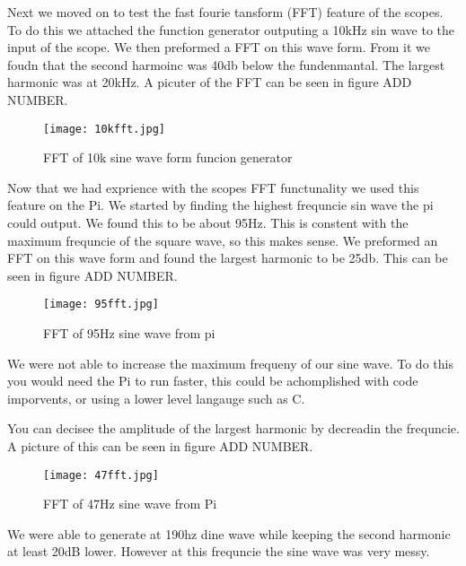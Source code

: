 \documentclass[prl,12pt,notitlepage,aps,onecolumn,superscriptaddress]{revtex4-1}
\begin{document}
Next we moved on to test the fast fourie tansform (FFT) feature of the scopes. To do this we attached the function generator outputing a 10kHz sin wave to the input of the scope. We then preformed a FFT on this wave form. From it we foudn that the second harmoinc was 40db below the fundenmantal. The largest harmonic was at 20kHz. A picuter of the FFT can be seen in figure ADD NUMBER.

\begin{figure}[h]
\begin{center}
\texttt{[image: 10kfft.jpg]}
\end{center}
\caption{\label{fig:pic} FFT of 10k sine wave form funcion generator}
\end{figure}

Now that we had exprience with the scopes FFT functunality we used this feature on the Pi. We started by finding the highest frequncie sin wave the pi could output. We found this to be about 95Hz. This is constent with the maximum frequncie of the square wave, so this makes sense. We preformed an FFT on this wave form and found the largest harmonic to be 25db. This can be seen in figure ADD NUMBER.

\begin{figure}[h]
\begin{center}
\texttt{[image: 95fft.jpg]}
\end{center}
\caption{\label{fig:pic} FFT of 95Hz sine wave from pi}
\end{figure}

We were not able to increase the maximum frequeny of our sine wave. To do this you would need the Pi to run faster, this could be achomplished with code imporvents, or using a lower level langauge such as C. 

You can decisee the amplitude of the largest harmonic by decreadin the frequncie. A picture of this can be seen in figure ADD NUMBER.

\begin{figure}[h]
\begin{center}
\texttt{[image: 47fft.jpg]}
\end{center}
\caption{\label{fig:pic} FFT of 47Hz sine wave from Pi}
\end{figure}

We were able to generate at 190hz dine wave while keeping the second harmonic at least 20dB lower. However at this frequncie the sine wave was very messy. 
\end{document}
